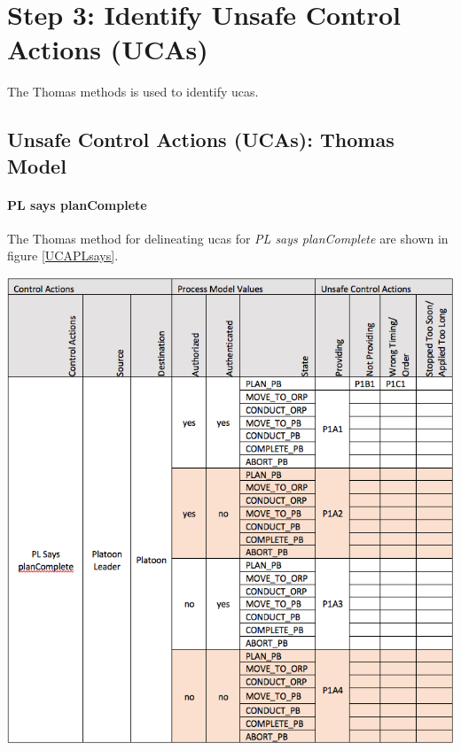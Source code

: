 \documentclass[../../main/main.tex]{subfiles}
\begin{document}
\clearpage

\section{Step 3: Identify Unsafe Control Actions (UCAs)}\label{chp:stpapb:uca}
The Thomas methods is used to identify \glspl{uca}.

\subsection{Unsafe Control Actions (UCAs): Thomas Model}
\clearpage
\paragraph*{PL says planComplete}
The Thomas method for delineating \glspl{uca} for \textit{PL says planComplete} are shown in figure \ref{UCAPLsays}.
\begin{table}[ht!]
\begin{center}
\includegraphics[width=\linewidth]{../figures/UCAPLsays}
\caption{Unsafe control actions \glspl{uca} for control action "PL says planComplete."}
\label{UCAPLsays}
\end{center}
\end{table}
\end{document}
